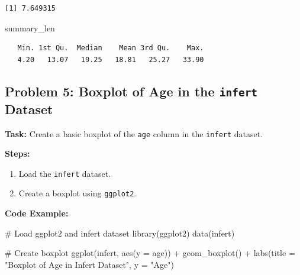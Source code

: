 \documentclass[
  letterpaper,
  DIV=11,
  numbers=noendperiod]{scrreprt}
\newenvironment{Shaded}{\begin{snugshade}}{\end{snugshade}}
\newcommand{\AttributeTok}[1]{\textcolor[rgb]{0.40,0.45,0.13}{#1}}
\newcommand{\CommentTok}[1]{\textcolor[rgb]{0.37,0.37,0.37}{#1}}
\newcommand{\FunctionTok}[1]{\textcolor[rgb]{0.28,0.35,0.67}{#1}}
\newcommand{\NormalTok}[1]{\textcolor[rgb]{0.00,0.23,0.31}{#1}}
\newcommand{\SpecialCharTok}[1]{\textcolor[rgb]{0.37,0.37,0.37}{#1}}
\newcommand{\StringTok}[1]{\textcolor[rgb]{0.13,0.47,0.30}{#1}}
\providecommand{\tightlist}{%
  \setlength{\itemsep}{0pt}\setlength{\parskip}{0pt}}\usepackage{longtable,booktabs,array}
\begin{document}
\begin{verbatim}
[1] 7.649315
\end{verbatim}

\begin{Shaded}
\begin{Highlighting}[]
\NormalTok{summary\_len}
\end{Highlighting}
\end{Shaded}

\begin{verbatim}
   Min. 1st Qu.  Median    Mean 3rd Qu.    Max. 
   4.20   13.07   19.25   18.81   25.27   33.90 
\end{verbatim}

\subsection*{\texorpdfstring{Problem 5: Boxplot of Age in the
\texttt{infert}
Dataset}{Problem 5: Boxplot of Age in the infert Dataset}}\label{problem-5-boxplot-of-age-in-the-infert-dataset}

\textbf{Task:} Create a basic boxplot of the \texttt{age} column in the
\texttt{infert} dataset.

\textbf{Steps:}

\begin{enumerate}
\def\labelenumi{\arabic{enumi}.}
\tightlist
\item
  Load the \texttt{infert} dataset.
\item
  Create a boxplot using \texttt{ggplot2}.
\end{enumerate}

\textbf{Code Example:}

\begin{Shaded}
\begin{Highlighting}[]
\CommentTok{\# Load ggplot2 and infert dataset}
\FunctionTok{library}\NormalTok{(ggplot2)}
\FunctionTok{data}\NormalTok{(infert)}

\CommentTok{\# Create boxplot}
\FunctionTok{ggplot}\NormalTok{(infert, }\FunctionTok{aes}\NormalTok{(}\AttributeTok{y =}\NormalTok{ age)) }\SpecialCharTok{+}
  \FunctionTok{geom\_boxplot}\NormalTok{() }\SpecialCharTok{+}
  \FunctionTok{labs}\NormalTok{(}\AttributeTok{title =} \StringTok{"Boxplot of Age in Infert Dataset"}\NormalTok{, }\AttributeTok{y =} \StringTok{"Age"}\NormalTok{)}
\end{Highlighting}
\end{Shaded}
\end{document}
